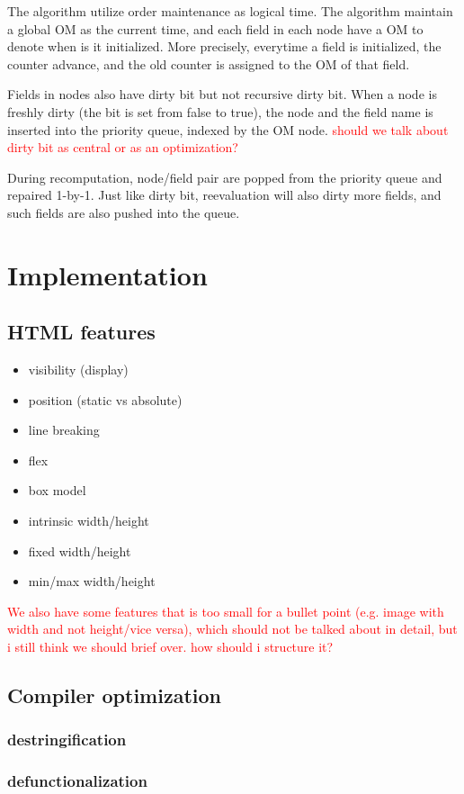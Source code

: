 \documentclass[format=acmsmall, review=false, screen=true]{acmart}
\newcommand\todo[1]{\textcolor{red}{#1}}
\begin{document}
The algorithm utilize order maintenance as logical time. The algorithm maintain a global OM as the current time, and each field in each node have a OM to denote when is it initialized. More precisely, everytime a field is initialized, the counter advance, and the old counter is assigned to the OM of that field.

Fields in nodes also have dirty bit but not recursive dirty bit. When a node is freshly dirty (the bit is set from false to true), the node and the field name is inserted into the priority queue, indexed by the OM node. \todo{should we talk about dirty bit as central or as an optimization?}

During recomputation, node/field pair are popped from the priority queue and repaired 1-by-1. Just like dirty bit, reevaluation will also dirty more fields, and such fields are also pushed into the queue.

\section{Implementation}
\subsection{HTML features}
\begin{itemize}
	\item visibility (display)
	\item position (static vs absolute)
	\item line breaking
	\item flex
	\item box model
	\item intrinsic width/height
	\item fixed width/height
	\item min/max width/height
\end{itemize}
\todo{We also have some features that is too small for a bullet point (e.g. image with width and not height/vice versa), which should not be talked about in detail, but i still think we should brief over. how should i structure it?}
\subsection{Compiler optimization}
\subsubsection{destringification}
\subsubsection{defunctionalization}
\end{document}

